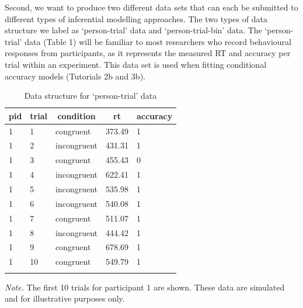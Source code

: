 \documentclass[
  man, donotrepeattitle,floatsintext]{apa6}
\begin{document}
Second, we want to produce two different data sets that can each be submitted to different types of inferential modelling approaches. The two types of data structure we label as `person-trial' data and `person-trial-bin' data. The `person-trial' data (Table 1) will be familiar to most researchers who record behavioural responses from participants, as it represents the measured RT and accuracy per trial within an experiment. This data set is used when fitting conditional accuracy models (Tutorials 2b and 3b).





\begin{table}[H]

\begin{center}
\begin{threeparttable}

\caption{\label{tab:ca-data-table}Data structure for `person-trial' data}

\begin{tabular}{lllll}
\toprule
pid & \multicolumn{1}{c}{trial} & \multicolumn{1}{c}{condition} & \multicolumn{1}{c}{rt} & \multicolumn{1}{c}{accuracy}\\
\midrule
1 & 1 & congruent & 373.49 & 1\\
1 & 2 & incongruent & 431.31 & 1\\
1 & 3 & congruent & 455.43 & 0\\
1 & 4 & incongruent & 622.41 & 1\\
1 & 5 & incongruent & 535.98 & 1\\
1 & 6 & incongruent & 540.08 & 1\\
1 & 7 & congruent & 511.07 & 1\\
1 & 8 & incongruent & 444.42 & 1\\
1 & 9 & congruent & 678.69 & 1\\
1 & 10 & congruent & 549.79 & 1\\
\bottomrule
\addlinespace
\end{tabular}

\begin{tablenotes}[para]
\normalsize{\textit{Note.} The first 10 trials for participant 1 are shown. These data are simulated and for illustrative purposes only.}
\end{tablenotes}

\end{threeparttable}
\end{center}

\end{table}
\end{document}
